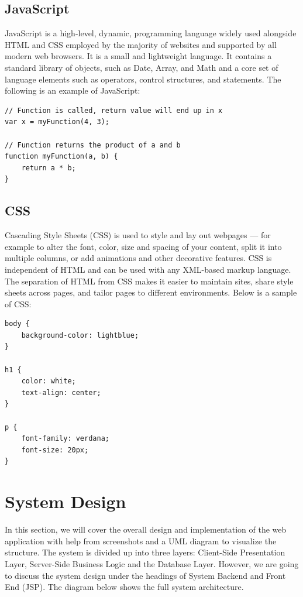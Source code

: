 \section{JavaScript}
JavaScript is a high-level, dynamic, programming language widely used alongside HTML and CSS employed by the majority of websites and supported by all modern web browsers. It is a small and lightweight language. It contains a standard library of objects, such as Date, Array, and Math and a core set of language elements such as operators, control structures, and statements\cite{JavaScript}.
The following is an example of JavaScript\cite{JavaScriptFunctions}:
\begin{verbatim}
// Function is called, return value will end up in x
var x = myFunction(4, 3);   

// Function returns the product of a and b
function myFunction(a, b) {
    return a * b;   
}
\end{verbatim}

\section{CSS}
Cascading Style Sheets (CSS) is used to style and lay out webpages — for example to alter the font, color, size and spacing of your content, split it into multiple columns, or add animations and other decorative features\cite{CSS}. CSS is independent of HTML and can be used with any XML-based markup language. The separation of HTML from CSS makes it easier to maintain sites, share style sheets across pages, and tailor pages to different environments. Below is a sample of CSS:

\begin{verbatim}
body {
    background-color: lightblue;
}

h1 {
    color: white;
    text-align: center;
}

p {
    font-family: verdana;
    font-size: 20px;
}
\end{verbatim}

\chapter{System Design}
In this section, we will cover the overall design and implementation
of the web application with help from screenshots and a UML diagram to visualize the structure. The system is divided up into three layers: Client-Side Presentation Layer, Server-Side Business Logic and the Database Layer. However, we are going to discuss the system design under the headings of System Backend and Front End (JSP). The diagram below shows the full system architecture.

